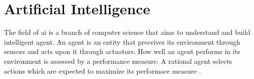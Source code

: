 \section{Artificial Intelligence}
\label{sec:theoretical_background:ai}

The field of \acrlong{ai} is a branch of computer science that aims to understand and build intelligent agent.
An agent is an entity that preceives its environment through sensors and acts upon it through actuators.
How well an agent performs in its environment is assessed by a performance measure.
A rational agent selects actions which are expected to maximize its performace measure \cite[p.~1--37]{ai}.
